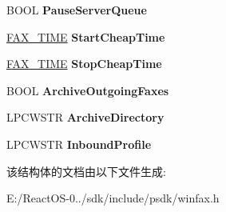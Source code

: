 \begin{DoxyCompactItemize}
\item 
\mbox{\label{struct___f_a_x___c_o_n_f_i_g_u_r_a_t_i_o_n_w_a55926fa43cc61dd56ab8434f04ed5775}} 
B\+O\+OL {\bfseries Pause\+Server\+Queue}
\item 
\mbox{\label{struct___f_a_x___c_o_n_f_i_g_u_r_a_t_i_o_n_w_a5aa3cf1e8ab0a9d04a1537b2c94e4962}} 
\hyperlink{struct___f_a_x___t_i_m_e}{F\+A\+X\+\_\+\+T\+I\+ME} {\bfseries Start\+Cheap\+Time}
\item 
\mbox{\label{struct___f_a_x___c_o_n_f_i_g_u_r_a_t_i_o_n_w_ad7f88d77be2444b13e0d8cb77de0fa2e}} 
\hyperlink{struct___f_a_x___t_i_m_e}{F\+A\+X\+\_\+\+T\+I\+ME} {\bfseries Stop\+Cheap\+Time}
\item 
\mbox{\label{struct___f_a_x___c_o_n_f_i_g_u_r_a_t_i_o_n_w_a61707745265bd88d19ffb625b2a84f27}} 
B\+O\+OL {\bfseries Archive\+Outgoing\+Faxes}
\item 
\mbox{\label{struct___f_a_x___c_o_n_f_i_g_u_r_a_t_i_o_n_w_a6268f354e9580ad802d8df4242032dcc}} 
L\+P\+C\+W\+S\+TR {\bfseries Archive\+Directory}
\item 
\mbox{\label{struct___f_a_x___c_o_n_f_i_g_u_r_a_t_i_o_n_w_aa315c59fe33f48c267e45c41d274c267}} 
L\+P\+C\+W\+S\+TR {\bfseries Inbound\+Profile}
\end{DoxyCompactItemize}


该结构体的文档由以下文件生成\+:\begin{DoxyCompactItemize}
\item 
E\+:/\+React\+O\+S-\/0../sdk/include/psdk/winfax.\+h\end{DoxyCompactItemize}
